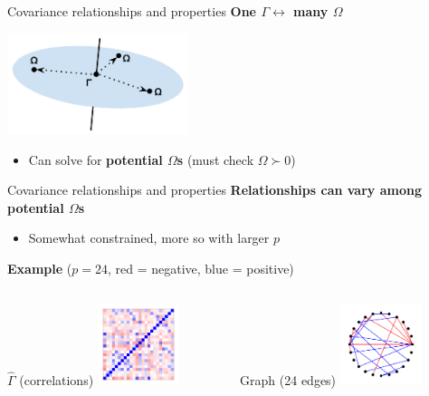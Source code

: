 \documentclass[professionalfonts]{beamer}
\begin{document}
\begin{frame}{Covariance relationships and properties}
\textbf{One $\Gamma \leftrightarrow$ many $\Omega$}
\begin{center}
\includegraphics[width=200px]{figs/matrix-explore.pdf}
\end{center}
\begin{itemize}
\item Can solve for \textbf{potential $\Omega$s} (must check $\Omega \succ 0$)
\end{itemize}
\end{frame}

\begin{frame}{Covariance relationships and properties}
\textbf{Relationships can vary among potential $\Omega$s}
\begin{itemize}
\item Somewhat constrained, more so with larger $p$
\end{itemize}
\textbf{Example} ($p = 24$, {\color{red} red} = negative, {\color{blue} blue} = positive)
\begin{columns}
\begin{column}{0.45\textwidth}
\begin{center}
$\widehat{\Gamma}$ (correlations)
\includegraphics[width=90px]{figs/example-clr-cor.pdf}
\end{center}
\end{column}
\begin{column}{0.45\textwidth}
\begin{center}
Graph (24 edges)
\includegraphics[width=90px]{figs/example-clr-graph.pdf}
\end{center}
\end{column}
\end{columns}
\end{frame}
\end{document}
